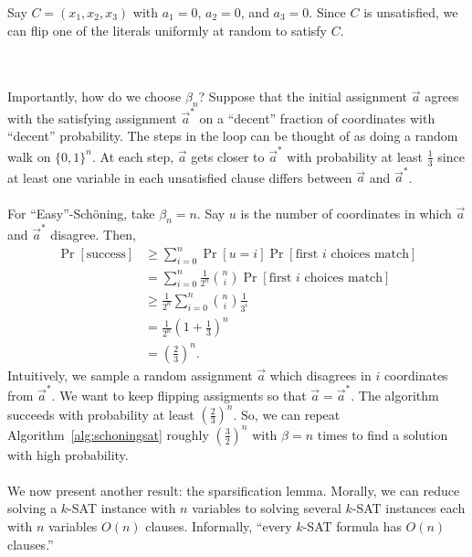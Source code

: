         \begin{example}
            Say \(C=(x_1,x_2,x_3)\) with \(a_1=0\), \(a_2=0\), and \(a_3=0\). Since \(C\) is unsatisfied, we can flip one of the literals uniformly at random to satisfy \(C\).
        \end{example}
        \vphantom
        \\
        \\
        Importantly, how do we choose \(\beta_n\)? Suppose that the initial assignment \(\vec{a}\) agrees with the satisfying assignment \(\vec{a}^*\) on a ``decent'' fraction of coordinates with ``decent'' probability. The steps in the loop can be thought of as doing a random walk on \(\{0,1\}^n\). At each step, \(\vec{a}\) gets closer to \(\vec{a}^*\) with probability at least \(\frac{1}{3}\) since at least one variable in each unsatisfied clause differs between \(\vec{a}\) and \(\vec{a}^*\). 
        \\
        \\
        For ``Easy''-Sch\"oning, take \(\beta_n=n\). Say \(u\) is the number of coordinates in which \(\vec{a}\) and \(\vec{a}^*\) disagree. Then,
        \begin{align*}
            \Pr[\text{success}]&\geq \sum_{i=0}^n \Pr[u=i]\Pr[\text{first }i\text{ choices match}] \\
            &=\sum_{i=0}^n \frac{1}{2^n}\binom{n}{i}\Pr[\text{first }i\text{ choices match}] \\
            &\geq\frac{1}{2^n}\sum_{i=0}^n\binom{n}{i}\frac{1}{3^i} \\
            &=\frac{1}{2^n}\left(1+\frac{1}{3}\right)^n \\
            &=\left(\frac{2}{3}\right)^n.
        \end{align*}
        Intuitively, we sample a random assignment \(\vec{a}\) which disagrees in \(i\) coordinates from \(\vec{a}^*\). We want to keep flipping assigments so that \(\vec{a}=\vec{a}^*\). The algorithm succeeds with probability at least \(\left(\frac{2}{3}\right)^n\). So, we can repeat Algorithm~\ref{alg:schoningsat} roughly \(\left(\frac{3}{2}\right)^n\) with \(\beta=n\) times to find a solution with high probability.
        \\
        \\
        We now present another result: the sparsification lemma. Morally, we can reduce solving a \(k\)-\textsc{SAT} instance with \(n\) variables to solving several \(k\)-\textsc{SAT} instances each with \(n\) variables \(O(n)\) clauses. Informally, ``every \(k\)-\textsc{SAT} formula has \(O(n)\) clauses.''
